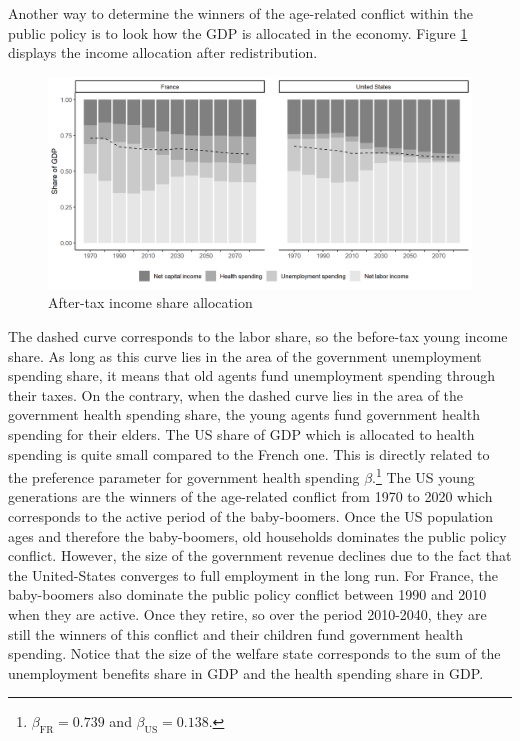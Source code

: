 Another way to determine the winners of the age-related conflict within the public policy is to look how the GDP is allocated in the economy. Figure \ref{fig:redis_step3_stacked} displays the income allocation after redistribution.
\begin{figure}[tb]
	\centering
	\includegraphics[width=1\linewidth]{../result/redistribution/redis_step3_stacked.png}
	\caption{After-tax income share allocation}
	\label{fig:redis_step3_stacked}
\end{figure}
The dashed curve corresponds to the labor share, so the before-tax young income share. As long as this curve lies in the area of the government unemployment spending share, it means that old agents fund unemployment spending through their taxes. On the contrary, when the dashed curve lies in the area of the government health spending share, the young agents fund government health spending for their elders. The US share of GDP which is allocated to health spending is quite small compared to the French one. This is directly related to the preference parameter for government health spending $\beta$.\footnote{$\beta_{\text{FR}} = 0.739$ and $\beta_{\text{US}} = 0.138$.} The US young generations are the winners of the age-related conflict from 1970 to 2020 which corresponds to the active period of the baby-boomers. Once the US population ages and therefore the baby-boomers, old households dominates the public policy conflict. However, the size of the government revenue declines due to the fact that the United-States converges to full employment in the long run. For France, the baby-boomers also dominate the public policy conflict between 1990 and 2010 when they are active. Once they retire, so over the period 2010-2040, they are still the winners of this conflict and their children fund government health spending. Notice that the size of the welfare state corresponds to the sum of the unemployment benefits share in GDP and the health spending share in GDP.

